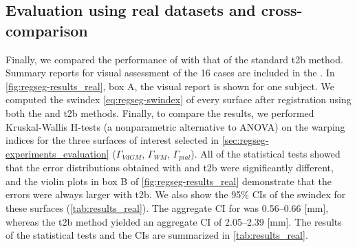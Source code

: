 \subsection{Evaluation using real datasets and cross-comparison}\label{sec:regseg-results_hcp}
Finally, we compared the performance of \regseg{} with that of the standard \gls*{t2b}
  method.
Summary reports for visual assessment of the 16 cases are included in the
  .
In \autoref{fig:regseg-results_real}, box A, the visual report is shown for one subject.
We computed the \gls*{swindex} \eqref{eq:regseg-swindex} of every surface after registration
  using both the \regseg{} and \gls*{t2b} methods.
Finally, to compare the results, we performed Kruskal-Wallis H-tests
  (a nonparametric alternative to ANOVA) on the warping indices for the three surfaces of
  interest selected in \autoref{sec:regseg-experiments_evaluation}
  ($\Gamma_{VdGM}$, $\Gamma_{WM}$, $\Gamma_{pial}$).
All of the statistical tests showed that the error distributions obtained with \regseg{} and
  \gls*{t2b} were significantly different, and the violin plots in box B of
  \autoref{fig:regseg-results_real} demonstrate that the errors were always larger with \gls*{t2b}.
We also show the 95\% CIs of the \gls*{swindex} for these surfaces 
  (\autoref{tab:results_real}).
The aggregate CI for \regseg{} was 0.56--0.66 [mm], whereas the \gls*{t2b} method
  yielded an aggregate CI of 2.05--2.39 [mm].
The results of the statistical tests and the CIs are summarized in \autoref{tab:results_real}.

